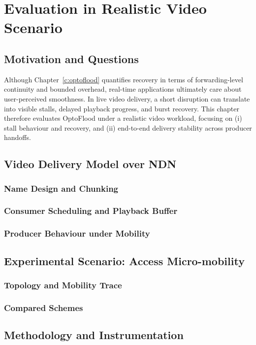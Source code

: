 \chapter{Evaluation in Realistic Video Scenario}
\label{c:video}

\section{Motivation and Questions}
Although Chapter~\ref{c:optoflood} quantifies recovery in terms of forwarding-level continuity and bounded overhead, real-time applications ultimately care about user-perceived smoothness. In live video delivery, a short disruption can translate into visible stalls, delayed playback progress, and burst recovery. This chapter therefore evaluates OptoFlood under a realistic video workload, focusing on (i) stall behaviour and recovery, and (ii) end-to-end delivery stability across producer handoffs.

\section{Video Delivery Model over NDN}
\subsection{Name Design and Chunking}
\subsection{Consumer Scheduling and Playback Buffer}
\subsection{Producer Behaviour under Mobility}

\section{Experimental Scenario: Access Micro-mobility}
\subsection{Topology and Mobility Trace}
\subsection{Compared Schemes}

\section{Methodology and Instrumentation}

